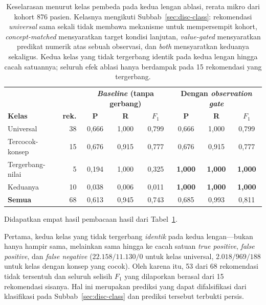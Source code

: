 \begin{table}[h]
\centering
\caption{Keselarasan menurut kelas pembeda pada kedua lengan ablasi, rerata mikro dari kohort
876 pasien. Kelasnya mengikuti Subbab~\ref{sec:disc-class}: rekomendasi
\emph{universal} sama sekali tidak membawa mekanisme untuk mempersempit kohort,
\emph{concept-matched} mensyaratkan target kondisi lanjutan, \emph{value-gated} mensyaratkan
predikat numerik atas sebuah observasi, dan \emph{both} mensyaratkan keduanya sekaligus. Kedua
kelas yang tidak tergerbang identik pada kedua lengan hingga cacah satuannya; seluruh efek
ablasi hanya berdampak pada 15 rekomendasi yang tergerbang.}
\label{tab:ablation-class}
\footnotesize
\setlength{\tabcolsep}{4pt}
\begin{tabular}{lr|ccc|ccc}
\hline
& & \multicolumn{3}{c|}{\textbf{\emph{Baseline} (tanpa gerbang)}}
  & \multicolumn{3}{c}{\textbf{Dengan \emph{observation gate}}} \\
\textbf{Kelas} & \textbf{rek.} & \textbf{P} & \textbf{R} & \textbf{$F_1$}
                               & \textbf{P} & \textbf{R} & \textbf{$F_1$} \\
\hline
Universal        & 38 & 0,666 & 1,000 & 0,799 & 0,666 & 1,000 & 0,799 \\
Tercocok-konsep  & 15 & 0,676 & 0,915 & 0,777 & 0,676 & 0,915 & 0,777 \\
Tergerbang-nilai & \phantom{0}5 & 0,194 & 1,000 & 0,325
                                & \textbf{1,000} & \textbf{1,000} & \textbf{1,000} \\
Keduanya         & 10 & 0,038 & 0,006 & 0,011
                                & \textbf{1,000} & \textbf{1,000} & \textbf{1,000} \\
\hline
\textbf{Semua}   & 68 & 0,613 & 0,945 & 0,743 & 0,685 & 0,993 & 0,811 \\
\hline
\end{tabular}
\end{table}

Didapatkan empat hasil pembacaan hasil dari Tabel~\ref{tab:ablation-class}.

Pertama, kedua kelas yang tidak tergerbang \emph{identik} pada kedua lengan---bukan hanya
hampir sama, melainkan sama hingga ke cacah satuan \emph{true positive}, \emph{false positive},
dan \emph{false negative} ($22.158/11.130/0$ untuk kelas universal, $2.018/969/188$ untuk
kelas dengan konsep yang cocok). Oleh karena itu, 53 dari 68 rekomendasi tidak tersentuh dan
seluruh selisih $F_1$ yang dilaporkan berasal dari 15 rekomendasi sisanya. Hal ini merupakan
prediksi yang dapat difalsifikasi dari klasifikasi pada Subbab~\ref{sec:disc-class} dan
prediksi tersebut terbukti persis.

